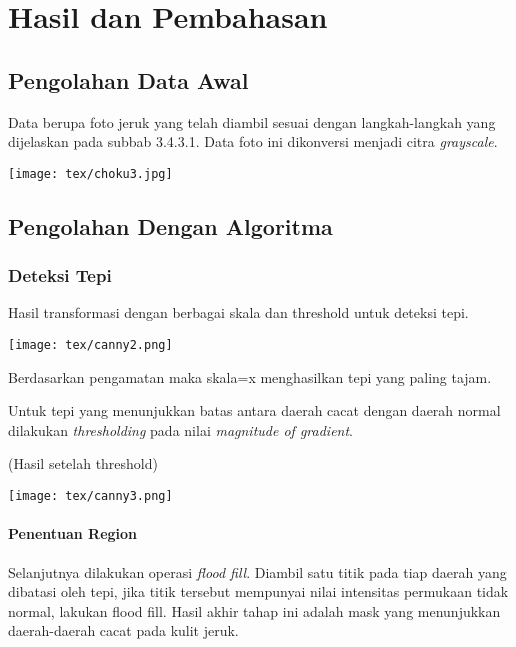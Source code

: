 \documentclass[laporan.tex]{subfiles}
\begin{document}
\chapter{Hasil dan Pembahasan}

\section{Pengolahan Data Awal}

Data berupa foto jeruk yang telah diambil sesuai dengan langkah-langkah yang dijelaskan pada subbab 3.4.3.1. Data foto ini dikonversi menjadi citra \emph{grayscale}.

\texttt{[image: tex/choku3.jpg]}

\section{Pengolahan Dengan Algoritma}

\subsection{Deteksi Tepi}

Hasil transformasi dengan berbagai skala dan threshold untuk deteksi tepi.

\texttt{[image: tex/canny2.png]}

Berdasarkan pengamatan maka skala=x menghasilkan tepi yang paling tajam.

Untuk tepi yang menunjukkan batas antara daerah cacat dengan daerah normal dilakukan \emph{thresholding} pada nilai \emph{magnitude of gradient}.

(Hasil setelah threshold)

\texttt{[image: tex/canny3.png]}

\subsubsection{Penentuan Region}

Selanjutnya dilakukan operasi \emph{flood fill}. Diambil satu titik pada tiap daerah yang dibatasi oleh tepi, jika titik tersebut mempunyai nilai intensitas permukaan tidak normal, lakukan flood fill. Hasil akhir tahap ini adalah mask yang menunjukkan daerah-daerah cacat pada kulit jeruk.
\end{document}
